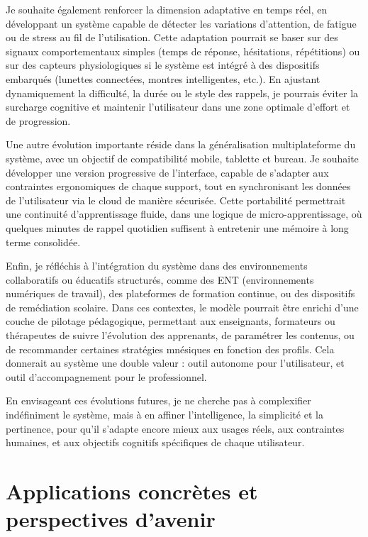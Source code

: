 \documentclass[11pt,a4paper]{report}
\begin{document}
Je souhaite également renforcer la dimension adaptative en temps réel, en développant un système capable de détecter les variations d’attention, de fatigue ou de stress au fil de l’utilisation. Cette adaptation pourrait se baser sur des signaux comportementaux simples (temps de réponse, hésitations, répétitions) ou sur des capteurs physiologiques si le système est intégré à des dispositifs embarqués (lunettes connectées, montres intelligentes, etc.). En ajustant dynamiquement la difficulté, la durée ou le style des rappels, je pourrais éviter la surcharge cognitive et maintenir l’utilisateur dans une zone optimale d’effort et de progression.

Une autre évolution importante réside dans la généralisation multiplateforme du système, avec un objectif de compatibilité mobile, tablette et bureau. Je souhaite développer une version progressive de l’interface, capable de s’adapter aux contraintes ergonomiques de chaque support, tout en synchronisant les données de l’utilisateur via le cloud de manière sécurisée. Cette portabilité permettrait une continuité d’apprentissage fluide, dans une logique de micro-apprentissage, où quelques minutes de rappel quotidien suffisent à entretenir une mémoire à long terme consolidée.

Enfin, je réfléchis à l’intégration du système dans des environnements collaboratifs ou éducatifs structurés, comme des ENT (environnements numériques de travail), des plateformes de formation continue, ou des dispositifs de remédiation scolaire. Dans ces contextes, le modèle pourrait être enrichi d’une couche de pilotage pédagogique, permettant aux enseignants, formateurs ou thérapeutes de suivre l’évolution des apprenants, de paramétrer les contenus, ou de recommander certaines stratégies mnésiques en fonction des profils. Cela donnerait au système une double valeur : outil autonome pour l’utilisateur, et outil d’accompagnement pour le professionnel.

En envisageant ces évolutions futures, je ne cherche pas à complexifier indéfiniment le système, mais à en affiner l’intelligence, la simplicité et la pertinence, pour qu’il s’adapte encore mieux aux usages réels, aux contraintes humaines, et aux objectifs cognitifs spécifiques de chaque utilisateur.

\chapter{Applications concrètes et perspectives d’avenir}
\end{document}
